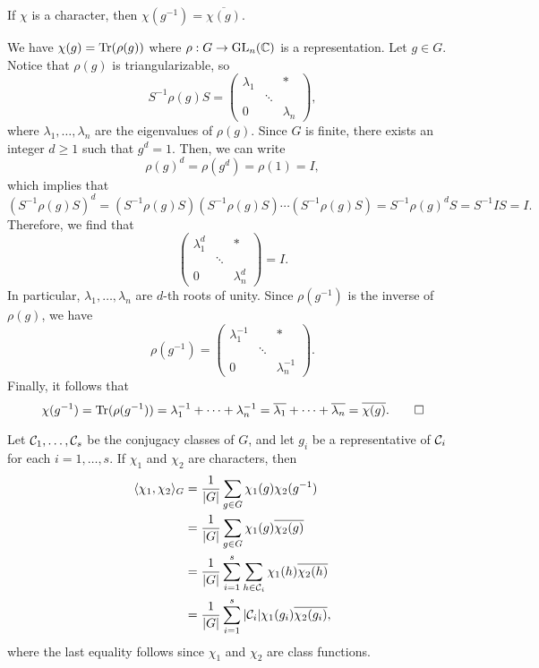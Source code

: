 \begin{remark}{}
    If $\chi$ is a character, then $\chi(g^{-1}) = \overline{\chi(g)}$. 
\end{remark}
\begin{pf}
    We have $\chi(g) = \operatorname{Tr}(\rho(g))$ where $\rho : G \to \operatorname{GL}_n(\mathbb{C})$ is a 
    representation. Let $g \in G$. Notice that $\rho(g)$ is triangularizable, 
    so 
    \[ S^{-1}\rho(g)S = \begin{pmatrix}
        \lambda_1 & & * \\ & \ddots & \\ 0 & & \lambda_n 
    \end{pmatrix}, \] 
    where $\lambda_1, \dots, \lambda_n$ are the eigenvalues of $\rho(g)$. 
    Since $G$ is finite, there exists an integer $d \geq 1$ such that $g^d = 1$. 
    Then, we can write 
    \[ \rho(g)^d = \rho(g^d) = \rho(1) = I, \] 
    which implies that 
    \[ (S^{-1}\rho(g)S)^d = (S^{-1}\rho(g)S)(S^{-1}\rho(g)S)\cdots 
    (S^{-1}\rho(g)S) = S^{-1}\rho(g)^d S = S^{-1}IS = I. \] 
    Therefore, we find that 
    \[ \begin{pmatrix}
        \lambda_1^d & & * \\ & \ddots & \\ 0 & & \lambda_n^d 
    \end{pmatrix} = I. \] 
    In particular, $\lambda_1, \dots, \lambda_n$ are $d$-th roots of unity. 
    Since $\rho(g^{-1})$ is the inverse of $\rho(g)$, we have 
    \[ \rho(g^{-1}) = \begin{pmatrix}
        \lambda_1^{-1} & & * \\ & \ddots & \\ 0 & & \lambda_n^{-1} 
    \end{pmatrix}. \] 
    Finally, it follows that 
    \[ \chi(g^{-1}) = \operatorname{Tr}(\rho(g^{-1})) = \lambda_1^{-1} + \cdots + \lambda_n^{-1}
    = \overline{\lambda_1} + \cdots + \overline{\lambda_n} = \overline{\chi(g)}. 
    \qedhere \] 
\end{pf}

Let ${\cal C}_1, \dots, {\cal C}_s$ be the conjugacy classes of $G$, and let 
$g_i$ be a representative of ${\cal C}_i$ for each $i = 1, \dots, s$. 
If $\chi_1$ and $\chi_2$ are characters, then 
\begin{align*}
    \langle \chi_1, \chi_2 \rangle_G 
    &= \frac1{|G|} \sum_{g\in G} \chi_1(g) \chi_2(g^{-1}) \\ 
    &= \frac1{|G|} \sum_{g\in G} \chi_1(g) \overline{\chi_2(g)} \\ 
    &= \frac1{|G|} \sum_{i=1}^s \sum_{h\in{\cal C}_i} \chi_1(h) \overline{\chi_2(h)} \\
    &= \frac1{|G|} \sum_{i=1}^s |{\cal C}_i| \chi_1(g_i) \overline{\chi_2(g_i)},
\end{align*}
where the last equality follows since $\chi_1$ and $\chi_2$ are class functions. 

